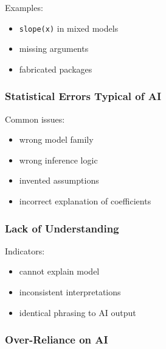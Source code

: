 \documentclass[
  letterpaper,
  8pt,
  a4paper]{book}
\providecommand{\tightlist}{%
  \setlength{\itemsep}{0pt}\setlength{\parskip}{0pt}}
\begin{document}
Examples:

\begin{itemize}
\tightlist
\item
  \texttt{slope(x)} in mixed models\\
\item
  missing arguments\\
\item
  fabricated packages
\end{itemize}

\subsubsection*{Statistical Errors Typical of
AI}\label{statistical-errors-typical-of-ai}

Common issues:

\begin{itemize}
\tightlist
\item
  wrong model family\\
\item
  wrong inference logic\\
\item
  invented assumptions\\
\item
  incorrect explanation of coefficients
\end{itemize}

\subsubsection*{Lack of Understanding}\label{lack-of-understanding}

Indicators:

\begin{itemize}
\tightlist
\item
  cannot explain model\\
\item
  inconsistent interpretations\\
\item
  identical phrasing to AI output
\end{itemize}

\subsubsection*{Over-Reliance on AI}\label{over-reliance-on-ai}
\end{document}
